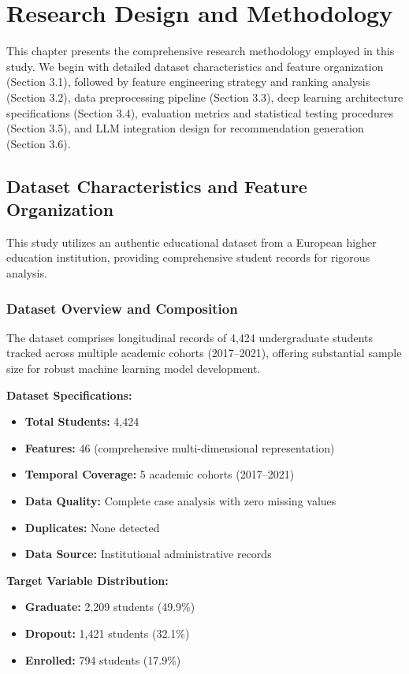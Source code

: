 \chapter{Research Design and Methodology}

This chapter presents the comprehensive research methodology employed in this study. We begin with detailed dataset characteristics and feature organization (Section 3.1), followed by feature engineering strategy and ranking analysis (Section 3.2), data preprocessing pipeline (Section 3.3), deep learning architecture specifications (Section 3.4), evaluation metrics and statistical testing procedures (Section 3.5), and LLM integration design for recommendation generation (Section 3.6).

\section{Dataset Characteristics and Feature Organization}

This study utilizes an authentic educational dataset from a European higher education institution, providing comprehensive student records for rigorous analysis.

\subsection{Dataset Overview and Composition}

The dataset comprises longitudinal records of 4,424 undergraduate students tracked across multiple academic cohorts (2017--2021), offering substantial sample size for robust machine learning model development.

\textbf{Dataset Specifications:}
\begin{itemize}
\item \textbf{Total Students:} 4,424
\item \textbf{Features:} 46 (comprehensive multi-dimensional representation)
\item \textbf{Temporal Coverage:} 5 academic cohorts (2017--2021)
\item \textbf{Data Quality:} Complete case analysis with zero missing values
\item \textbf{Duplicates:} None detected
\item \textbf{Data Source:} Institutional administrative records
\end{itemize}

\textbf{Target Variable Distribution:}
\begin{itemize}
\item \textbf{Graduate:} 2,209 students (49.9\%)
\item \textbf{Dropout:} 1,421 students (32.1\%)
\item \textbf{Enrolled:} 794 students (17.9\%)
\end{itemize}

